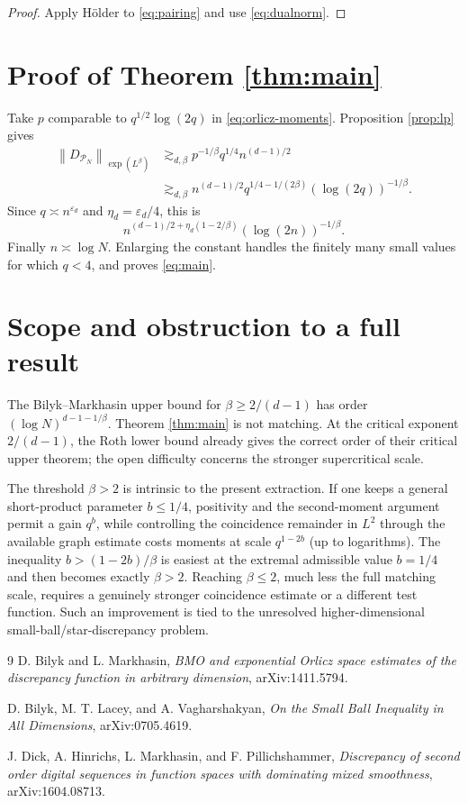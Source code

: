 \documentclass[11pt]{article}
\newcommand{\norm}[2]{\left\lVert #1\right\rVert_{#2}}
\begin{document}
\begin{proof}
Apply H\"older to \eqref{eq:pairing} and use
\eqref{eq:dualnorm}.
\end{proof}

\section{Proof of Theorem \ref{thm:main}}

Take $p$ comparable to $q^{1/2}\log(2q)$ in
\eqref{eq:orlicz-moments}.  Proposition \ref{prop:lp} gives
\begin{align*}
 \norm{D_{\mathcal P_N}}{\exp(L^\beta)}
 &\gtrsim_{d,\beta}
 p^{-1/\beta}q^{1/4}n^{(d-1)/2}\\
 &\gtrsim_{d,\beta}
 n^{(d-1)/2}
 q^{1/4-1/(2\beta)}(\log(2q))^{-1/\beta}.
\end{align*}
Since $q\asymp n^{\varepsilon_d}$ and
$\eta_d=\varepsilon_d/4$, this is
\[
 n^{(d-1)/2+\eta_d(1-2/\beta)}
 (\log(2n))^{-1/\beta}.
\]
Finally $n\asymp\log N$.  Enlarging the constant handles the finitely many
small values for which $q<4$, and proves \eqref{eq:main}.

\section{Scope and obstruction to a full result}

The Bilyk--Markhasin upper bound for $\beta\geq2/(d-1)$ has order
$(\log N)^{d-1-1/\beta}$.  Theorem \ref{thm:main} is not matching.
At the critical exponent $2/(d-1)$, the Roth lower bound already gives the
correct order of their critical upper theorem; the open difficulty concerns
the stronger supercritical scale.

The threshold $\beta>2$ is intrinsic to the present extraction.  If one keeps
a general short-product parameter $b\leq1/4$, positivity and the second-moment
argument permit a gain $q^b$, while controlling the coincidence remainder in
$L^2$ through the available graph estimate costs moments at scale
$q^{1-2b}$ (up to logarithms).  The inequality
$b>(1-2b)/\beta$ is easiest at the extremal admissible value $b=1/4$ and then
becomes exactly $\beta>2$.  Reaching $\beta\leq2$, much less the full matching
scale, requires a genuinely stronger coincidence estimate or a different test
function.  Such an improvement is tied to the unresolved higher-dimensional
small-ball/star-discrepancy problem.

\begin{thebibliography}{9}
D. Bilyk and L. Markhasin,
\emph{BMO and exponential Orlicz space estimates of the discrepancy function
in arbitrary dimension}, arXiv:1411.5794.

D. Bilyk, M. T. Lacey, and A. Vagharshakyan,
\emph{On the Small Ball Inequality in All Dimensions}, arXiv:0705.4619.

J. Dick, A. Hinrichs, L. Markhasin, and F. Pillichshammer,
\emph{Discrepancy of second order digital sequences in function spaces with
dominating mixed smoothness}, arXiv:1604.08713.
\end{thebibliography}
\end{document}
